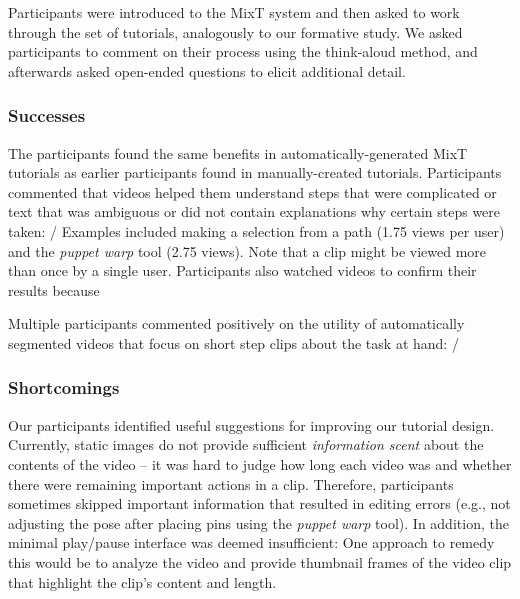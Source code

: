 Participants were introduced to the MixT system and then asked to work through the set of tutorials, analogously to our formative study. We asked participants to comment on their process using the think-aloud method, and afterwards asked open-ended questions to elicit additional detail.

\subsubsection{Successes}
The participants found the same benefits in automatically-generated MixT tutorials as earlier participants found in manually-created tutorials. Participants commented that videos helped them understand steps that were complicated or text that was ambiguous or did not contain explanations why certain steps were taken:  /  Examples included making a selection from a path (1.75 views per user) and the \emph{puppet warp} tool (2.75 views). Note that a clip might be viewed more than once by a single user. Participants also watched videos to confirm their results because 

Multiple participants commented positively on the utility of automatically segmented videos that focus on short step clips about the task at hand:  / 

\subsubsection{Shortcomings}
Our participants identified useful suggestions for improving our tutorial design. Currently, static images do not provide sufficient \emph{information scent} about the contents of the video – it was hard to judge how long each video was and whether there were remaining important actions in a clip. Therefore, participants sometimes skipped important information that resulted in editing errors (e.g., not adjusting the pose after placing pins using the \emph{puppet warp} tool). In addition, the minimal play/pause interface was deemed insufficient:  One approach to remedy this would be to analyze the video and provide thumbnail frames of the video clip that highlight the clip's content and length.

